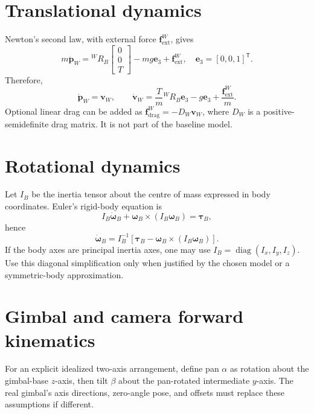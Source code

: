 \documentclass[11pt,a4paper]{article}
\begin{document}
\section{Translational dynamics}
Newton's second law, with external force \(\mathbf f_{\mathrm{ext}}^W\), gives
\[
m\ddot{\mathbf p}_W={}^WR_B\begin{bmatrix}0\\0\\T\end{bmatrix}
-mg\mathbf e_3+\mathbf f_{\mathrm{ext}}^W,
\quad \mathbf e_3=[0,0,1]^{\mathsf T}.
\]
Therefore,
\[
\dot{\mathbf p}_W=\mathbf v_W,\qquad
\dot{\mathbf v}_W=\frac{T}{m}{}^WR_B\mathbf e_3-g\mathbf e_3+
\frac{\mathbf f_{\mathrm{ext}}^W}{m}.
\]
Optional linear drag can be added as \(\mathbf f_{\mathrm{drag}}^W=-D_W\mathbf v_W\), where \(D_W\) is a positive-semidefinite drag matrix. It is not part of the baseline model.

\section{Rotational dynamics}
Let \(I_B\) be the inertia tensor about the centre of mass expressed in body coordinates. Euler's rigid-body equation is
\[
I_B\dot{\boldsymbol\omega}_B+
\boldsymbol\omega_B\times(I_B\boldsymbol\omega_B)=\boldsymbol\tau_B,
\]
hence
\[
\dot{\boldsymbol\omega}_B=I_B^{-1}\left[
\boldsymbol\tau_B-\boldsymbol\omega_B\times(I_B\boldsymbol\omega_B)\right].
\]
If the body axes are principal inertia axes, one may use \(I_B=\operatorname{diag}(I_x,I_y,I_z)\). Use this diagonal simplification only when justified by the chosen model or a symmetric-body approximation.

\section{Gimbal and camera forward kinematics}
For an explicit idealized two-axis arrangement, define pan \(\alpha\) as rotation about the gimbal-base \(z\)-axis, then tilt \(\beta\) about the pan-rotated intermediate \(y\)-axis. The real gimbal's axis directions, zero-angle pose, and offsets must replace these assumptions if different.
\end{document}
